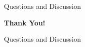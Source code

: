 \documentclass[aspectratio=169]{beamer}
\begin{document}
\begin{frame}{Questions and Discussion}
\begin{center}
\Large \textbf{Thank You!}
\vspace{1cm}

\large Questions and Discussion
\end{center}
\end{frame}
\end{document}
